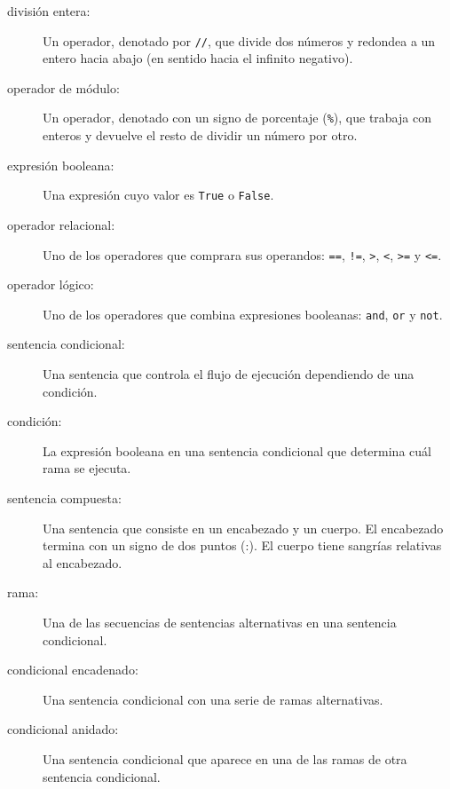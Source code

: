 \documentclass[10pt]{book}
\begin{document}
\begin{description}

\item[división entera:] Un operador, denotado por {\tt //}, que divide dos
  números y redondea a un entero hacia abajo (en sentido hacia el infinito negativo).

\item[operador de módulo:]  Un operador, denotado con un signo de porcentaje
({\tt \%}), que trabaja con enteros y devuelve el resto de
dividir un número por otro.

\item[expresión booleana:]  Una expresión cuyo valor es
{\tt True} o {\tt False}.

\item[operador relacional:] Uno de los operadores que comprara
sus operandos: {\tt ==}, {\tt !=}, {\tt >}, {\tt <}, {\tt >=} y {\tt <=}.

\item[operador lógico:] Uno de los operadores que combina expresiones
booleanas: {\tt and}, {\tt or} y {\tt not}.

\item[sentencia condicional:]  Una sentencia que controla el flujo de
ejecución dependiendo de una condición.

\item[condición:] La expresión booleana en una sentencia condicional
que determina cuál rama se ejecuta.

\item[sentencia compuesta:]  Una sentencia que consiste en un encabezado
y un cuerpo.  El encabezado termina con un signo de dos puntos (:).  El cuerpo tiene sangrías
relativas al encabezado.

\item[rama:] Una de las secuencias de sentencias alternativas en
una sentencia condicional.

\item[condicional encadenado:]  Una sentencia condicional con una serie
de ramas alternativas.

\item[condicional anidado:]  Una sentencia condicional que aparece
en una de las ramas de otra sentencia condicional.


\end{description}
\end{document}
